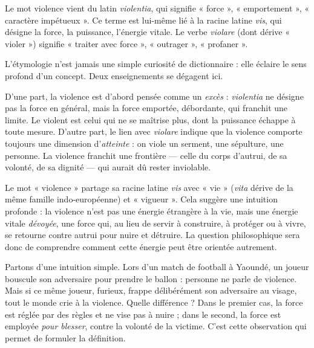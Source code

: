 \documentclass[11pt]{article}
\newcommand{\cle}[1]{{\popxbold\color{popdark}#1}}
\newcounter{popsec}
\newcounter{popsub}
\newcommand{\courssub}[1]{%
  \stepcounter{popsub}%
  \par\vspace{9pt}\noindent{\popxbold\fontsize{11.5}{13}\selectfont\color{popink}{\color{poporange}\thepopsec.\thepopsub}\hspace{6pt}#1}\par\nopagebreak\vspace{4pt}
}
\begin{document}
\begin{definition}[Étymologie]
Le mot \cle{violence} vient du latin \emph{violentia}, qui signifie « force », « emportement », « caractère impétueux ». Ce terme est lui-même lié à la racine latine \emph{vis}, qui désigne la force, la puissance, l'énergie vitale. Le verbe \emph{violare} (dont dérive « violer ») signifie « traiter avec force », « outrager », « profaner ».
\end{definition}

L'étymologie n'est jamais une simple curiosité de dictionnaire : elle éclaire le sens profond d'un concept. Deux enseignements se dégagent ici.

D'une part, la violence est d'abord pensée comme un \emph{excès} : \emph{violentia} ne désigne pas la force en général, mais la force emportée, débordante, qui franchit une limite. Le violent est celui qui ne se maîtrise plus, dont la puissance échappe à toute mesure. D'autre part, le lien avec \emph{violare} indique que la violence comporte toujours une dimension d'\emph{atteinte} : on viole un serment, une sépulture, une personne. La violence franchit une frontière — celle du corps d'autrui, de sa volonté, de sa dignité — qui aurait dû rester inviolable.

\begin{savaistu}
Le mot « violence » partage sa racine latine \emph{vis} avec « vie » (\emph{vita} dérive de la même famille indo-européenne) et « vigueur ». Cela suggère une intuition profonde : la violence n'est pas une énergie étrangère à la vie, mais une énergie vitale \emph{dévoyée}, une force qui, au lieu de servir à construire, à protéger ou à vivre, se retourne contre autrui pour nuire et détruire. La question philosophique sera donc de comprendre comment cette énergie peut être orientée autrement.
\end{savaistu}

\courssub{Définition générale de la violence}

Partons d'une intuition simple. Lors d'un match de football à Yaoundé, un joueur bouscule son adversaire pour prendre le ballon : personne ne parle de violence. Mais si ce même joueur, furieux, frappe délibérément son adversaire au visage, tout le monde crie à la violence. Quelle différence ? Dans le premier cas, la force est réglée par des règles et ne vise pas à nuire ; dans le second, la force est employée \emph{pour blesser}, contre la volonté de la victime. C'est cette observation qui permet de formuler la définition.
\end{document}
